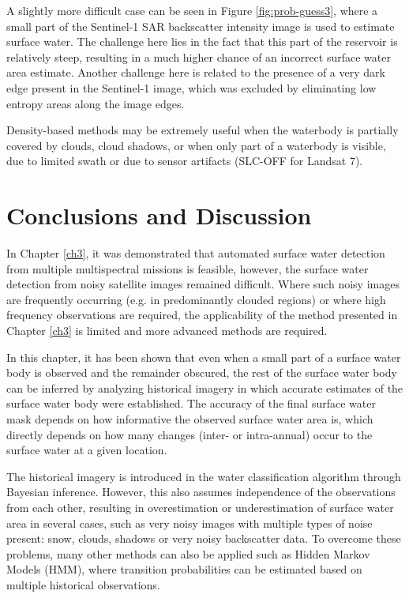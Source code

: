 A slightly more difficult case can be seen in Figure \ref{fig:prob-guess3}, where a small part of the Sentinel-1 \gls{SAR} backscatter intensity image is used to estimate surface water. The challenge here lies in the fact that this part of the reservoir is relatively steep, resulting in a much higher chance of an incorrect surface water area estimate. Another challenge here is related to the presence of a very dark edge present in the Sentinel-1 image, which was excluded by eliminating low entropy areas along the image edges. 

Density-based methods may be extremely useful when the waterbody is partially covered by clouds, cloud shadows, or when only part of a waterbody is visible, due to limited swath or due to sensor artifacts (SLC-OFF for Landsat 7). 

\section{Conclusions and Discussion}

In Chapter \ref{ch3}, it was demonstrated that automated surface water detection from multiple multispectral missions is feasible, however, the surface water detection from noisy satellite images remained difficult. Where such noisy images are frequently occurring (e.g. in predominantly clouded regions) or where high frequency observations are required, the applicability of the method presented in Chapter \ref{ch3} is limited and more advanced methods are required. 

In this chapter, it has been shown that even when a small part of a surface water body is observed and the remainder obscured, the rest of the surface water body can be inferred by analyzing historical imagery in which accurate estimates of the surface water body were established. The accuracy of the final surface water mask depends on how informative the observed surface water area is, which directly depends on how many changes (inter- or intra-annual) occur to the surface water at a given location.

The historical imagery is introduced in the water classification algorithm through Bayesian inference. However, this also assumes independence of the observations from each other, resulting in overestimation or underestimation of surface water area in several cases, such as very noisy images with multiple types of noise present: snow, clouds, shadows or very noisy backscatter data. To overcome these problems, many other methods can also be applied such as Hidden Markov Models (HMM), where transition probabilities can be estimated based on multiple historical observations.

